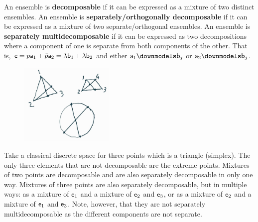 
\begin{mathSection}
\begin{defn}
	An ensemble is \textbf{decomposable} if it can be expressed as a mixture of two distinct ensembles. An ensemble is \textbf{separately/orthogonally decomposable} if it can be expressed as a mixture of two separate/orthogonal ensembles. An ensemble is \textbf{separately multidecomposable} if it can be expressed as two decompositions where a component of one is separate from both components of the other. That is, $\ens = p \ens[a]_1 + \bar{p} \ens[a]_2 = \lambda \ens[b]_1 +\bar{\lambda} \ens[b]_2$ and either $\ens[a]_1 \separate \ens[b]_j$ or $\ens[a]_2 \separate \ens[b]_j$.
\end{defn}

\begin{figure}[H]
	\centering
	\includegraphics[width=0.4\textwidth]{tempimages/MultipleDecomposition.jpg}
\end{figure}

\begin{remark}
	Take a classical discrete space for three points which is a triangle (simplex). The only three elements that are not decomposable are the extreme points. Mixtures of two points are decomposable and are also separately decomposable in only one way. Mixtures of three points are also separately decomposable, but in multiple ways: as a mixture of $\ens_1$ and a mixture of $\ens_2$ and $\ens_3$, or as a mixture of $\ens_2$ and a mixture of $\ens_1$ and $\ens_3$. Note, however, that they are not separately multidecomposable as the different components are not separate.
	

\end{remark}
\end{mathSection}
